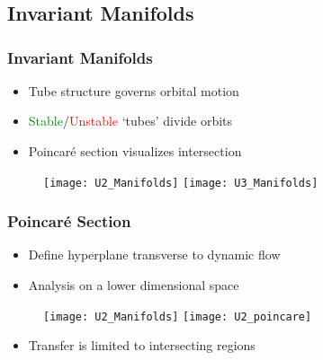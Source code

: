 \section*{}
\subsection*{Invariant Manifolds}

\begin{frame}%
\frametitle{Invariant Manifolds}
\begin{itemize}
	\item Tube structure governs orbital motion
	\item \textcolor{green}{Stable}/\textcolor{red}{Unstable} `tubes' divide orbits
	\item Poincar\'e section visualizes intersection
\end{itemize}
 \begin{figure}
     \centering
     \texttt{[image: U2\_Manifolds]}%
     \texttt{[image: U3\_Manifolds]}
\end{figure}
\end{frame}%

\begin{frame}[t]%
\frametitle{Poincar\'e Section}
	\begin{itemize}
		\item Define hyperplane transverse to dynamic flow
		\item Analysis on a lower dimensional space
	\end{itemize}
 \begin{figure}
     \centering
     \texttt{[image: U2\_Manifolds]}%
     \texttt{[image: U2\_poincare]}
\end{figure}

	\pause
	\begin{itemize}
		\item Transfer is limited to intersecting regions
	\end{itemize}
\end{frame}%

